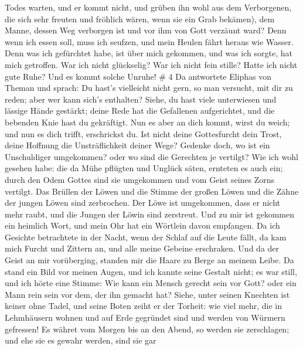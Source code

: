 Todes warten, und er kommt nicht, und grüben ihn wohl aus dem
Verborgenen,  die sich sehr freuten und fröhlich wären,
wenn sie ein Grab bekämen),  dem Manne, dessen Weg
verborgen ist und vor ihm von Gott verzäunt ward?  Denn
wenn ich essen soll, muss ich seufzen, und mein Heulen fährt heraus wie
Wasser.  Denn was ich gefürchtet habe, ist über mich
gekommen, und was ich sorgte, hat mich getroffen.  War ich
nicht glückselig? War ich nicht fein stille? Hatte ich nicht gute Ruhe?
Und es kommt solche Unruhe! \# 4  Da antwortete Eliphas von
Theman und sprach:  Du hast's vielleicht nicht gern, so man
versucht, mit dir zu reden; aber wer kann sich's enthalten? 
Siehe, du hast viele unterwiesen und lässige Hände gestärkt;
 deine Rede hat die Gefallenen aufgerichtet, und die
bebenden Knie hast du gekräftigt.  Nun es aber an dich
kommt, wirst du weich; und nun es dich trifft, erschrickst du.
 Ist nicht deine Gottesfurcht dein Trost, deine Hoffnung die
Unsträflichkeit deiner Wege?  Gedenke doch, wo ist ein
Unschuldiger umgekommen? oder wo sind die Gerechten je vertilgt?
 Wie ich wohl gesehen habe: die da Mühe pflügten und Unglück
säten, ernteten es auch ein;  durch den Odem Gottes sind sie
umgekommen und vom Geist seines Zorns vertilgt.  Das
Brüllen der Löwen und die Stimme der großen Löwen und die Zähne der
jungen Löwen sind zerbrochen.  Der Löwe ist umgekommen,
dass er nicht mehr raubt, und die Jungen der Löwin sind zerstreut.
 Und zu mir ist gekommen ein heimlich Wort, und mein Ohr
hat ein Wörtlein davon empfangen.  Da ich Gesichte
betrachtete in der Nacht, wenn der Schlaf auf die Leute fällt,
 da kam mich Furcht und Zittern an, und alle meine Gebeine
erschraken.  Und da der Geist an mir vorüberging, standen
mir die Haare zu Berge an meinem Leibe.  Da stand ein Bild
vor meinen Augen, und ich kannte seine Gestalt nicht; es war still, und
ich hörte eine Stimme:  Wie kann ein Mensch gerecht sein
vor Gott? oder ein Mann rein sein vor dem, der ihn gemacht hat?
 Siehe, unter seinen Knechten ist keiner ohne Tadel, und
seine Boten zeiht er der Torheit:  wie viel mehr, die in
Lehmhäusern wohnen und auf Erde gegründet sind und werden von Würmern
gefressen!  Es währet vom Morgen bis an den Abend, so
werden sie zerschlagen; und ehe sie es gewahr werden, sind sie gar

